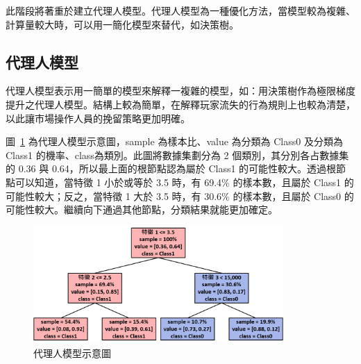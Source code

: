 此階段將著重於建立代理人模型。代理人模型為一種優化方法，當模型較為複雜、計算量較大時，可以用一簡化模型來替代，如決策樹。

\subsection{代理人模型}
\label{subsec:SurrogateModel}

代理人模型表示用一簡單的模型來解釋一複雜的模型，如：用決策樹作為極限梯度提升之代理人模型。結構上較為簡單，在解釋玩家流失的行為規則上也較為清楚，以此讓市場操作人員的挽留策略更加明確。

圖~\ref{fig:Image_SurrogateModel} 為代理人模型示意圖，sample 為樣本比、value 為分類為 Class0 及分類為 Class1 的機率、class為類別。此圖將數據集劃分為 2 個類別，其分別各占數據集的 0.36 與 0.64，所以最上面的根節點認為屬於 Class1 的可能性較大。透過根節點可以知道，當特徵 1 小於或等於 3.5 時，有 69.4\% 的樣本數，且屬於 Class1 的可能性較大；反之，當特徵 1 大於 3.5 時，有 30.6\% 的樣本數，且屬於 Class0 的可能性較大。繼續向下通過其他節點，分類結果就能更加確定。

\begin{figure}[!htb]
  \begin{center}
    \includegraphics[width=0.85\textwidth]{figures/Image_SurrogateModel.png}
    \caption[代理人模型示意圖]{代理人模型示意圖}
    \label{fig:Image_SurrogateModel}
  \end{center}
\end{figure}
\newpage